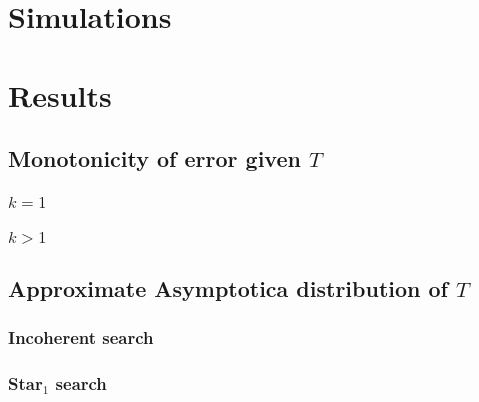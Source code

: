 \documentclass[10pt,journal,cspaper,compsoc]{IEEEtran}
\begin{document}



\section{Simulations} %
\label{sec:simulation}




\section{Results} %
\label{sec:results}




\subsection{Monotonicity of error given $T$} %
\label{ssub:monotonicity_of_error_given_t_}


\subsubsection{$k=1$} %
\label{par:paragraph_name}



\subsubsection{$k>1$} %
\label{par:_k_1_}



\subsection{Approximate Asymptotica distribution of $T$} %
\label{ssub:approximate_asymptotica_distribution_of_t_}

\subsubsection{Incoherent search} %
\label{par:incoherent_search}



\subsubsection{Star$_1$ search} %
\label{par:star__1_search}
\end{document}
